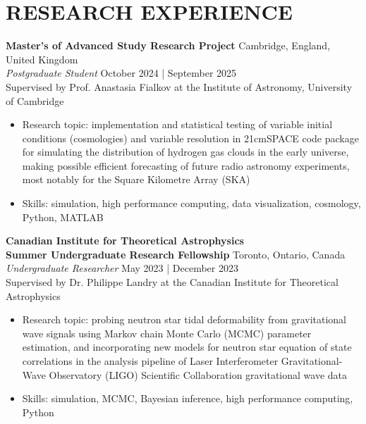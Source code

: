 \documentclass[a4paper,10pt]{extarticle}
\begin{document}
\section*{RESEARCH EXPERIENCE}
\textbf{Master's of Advanced Study Research Project} \hfill Cambridge, England, United Kingdom\\
\textit{Postgraduate Student} \hfill October 2024 | September 2025\\
Supervised by Prof. Anastasia Fialkov at the Institute of Astronomy, University of Cambridge
\begin{itemize}
    \item Research topic: implementation and statistical testing of variable initial conditions (cosmologies) and variable resolution in 21cmSPACE code package for simulating the distribution of hydrogen gas clouds in the early universe, making possible efficient forecasting of future radio astronomy experiments, most notably for the Square Kilometre Array (SKA)
    
    \item Skills: simulation, high performance computing, data visualization, cosmology, Python, MATLAB
\end{itemize}

\textbf{Canadian Institute for Theoretical Astrophysics\\
    Summer Undergraduate Research Fellowship} \hfill Toronto, Ontario, Canada\\
\textit{Undergraduate Researcher} \hfill May 2023 | December 2023\\
Supervised by Dr. Philippe Landry at the Canadian Institute for Theoretical Astrophysics
\begin{itemize}
    \item Research topic: probing neutron star tidal deformability from gravitational wave signals using Markov chain Monte Carlo (MCMC) parameter estimation, and incorporating new models for neutron star equation of state correlations in the analysis pipeline of Laser Interferometer Gravitational-Wave Observatory (LIGO) Scientific Collaboration gravitational wave data

    \item Skills: simulation, MCMC, Bayesian inference, high performance computing, Python
\end{itemize}
\end{document}
